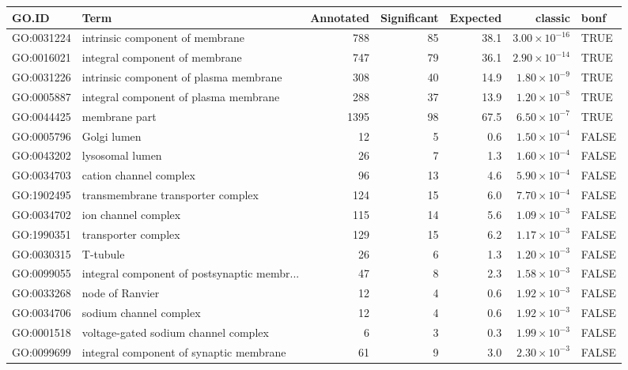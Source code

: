\begin{table}[ht]
\centering
\begin{adjustbox}{max width=\textwidth}
\begin{tabular}{llrrrrl}
  \hline
GO.ID & Term & Annotated & Significant & Expected & classic & bonf \\ 
  \hline
GO:0031224 & intrinsic component of membrane & 788 & 85 & 38.1 & $3.00 \times 10^{-16}$ & TRUE \\ 
  GO:0016021 & integral component of membrane & 747 & 79 & 36.1 & $2.90 \times 10^{-14}$ & TRUE \\ 
  GO:0031226 & intrinsic component of plasma membrane & 308 & 40 & 14.9 & $1.80 \times 10^{-9}$ & TRUE \\ 
  GO:0005887 & integral component of plasma membrane & 288 & 37 & 13.9 & $1.20 \times 10^{-8}$ & TRUE \\ 
  GO:0044425 & membrane part & 1395 & 98 & 67.5 & $6.50 \times 10^{-7}$ & TRUE \\ 
  GO:0005796 & Golgi lumen & 12 & 5 & 0.6 & $1.50 \times 10^{-4}$ & FALSE \\ 
  GO:0043202 & lysosomal lumen & 26 & 7 & 1.3 & $1.60 \times 10^{-4}$ & FALSE \\ 
  GO:0034703 & cation channel complex & 96 & 13 & 4.6 & $5.90 \times 10^{-4}$ & FALSE \\ 
  GO:1902495 & transmembrane transporter complex & 124 & 15 & 6.0 & $7.70 \times 10^{-4}$ & FALSE \\ 
  GO:0034702 & ion channel complex & 115 & 14 & 5.6 & $1.09 \times 10^{-3}$ & FALSE \\ 
  GO:1990351 & transporter complex & 129 & 15 & 6.2 & $1.17 \times 10^{-3}$ & FALSE \\ 
  GO:0030315 & T-tubule & 26 & 6 & 1.3 & $1.20 \times 10^{-3}$ & FALSE \\ 
  GO:0099055 & integral component of postsynaptic membr... & 47 & 8 & 2.3 & $1.58 \times 10^{-3}$ & FALSE \\ 
  GO:0033268 & node of Ranvier & 12 & 4 & 0.6 & $1.92 \times 10^{-3}$ & FALSE \\ 
  GO:0034706 & sodium channel complex & 12 & 4 & 0.6 & $1.92 \times 10^{-3}$ & FALSE \\ 
  GO:0001518 & voltage-gated sodium channel complex & 6 & 3 & 0.3 & $1.99 \times 10^{-3}$ & FALSE \\ 
  GO:0099699 & integral component of synaptic membrane & 61 & 9 & 3.0 & $2.30 \times 10^{-3}$ & FALSE \\ 

\end{tabular}
\end{adjustbox}
\end{table}
